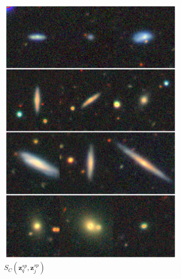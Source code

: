 \documentclass[a4paper,12pt]{article}
\begin{document}
\begin{figure}[H]
\begin{subfigure}{0.22\textwidth}
        \includegraphics[height=0.21\textheight]{../figures/images_sp_sp.png}
        \caption{$S_C(\mathbf{z}_q^{sp}, \mathbf{z}_j^{sp})$}
        \label{fig:retrieval_3}
    \end{subfigure}%
    \hfill
    \begin{subfigure}{0.22\textwidth}
        \centering

\end{subfigure}
\end{figure}
\end{document}
